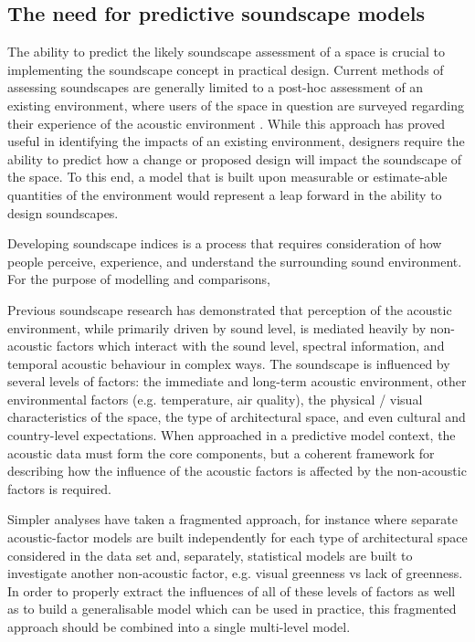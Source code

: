 \subsection{The need for predictive soundscape models}
The ability to predict the likely soundscape assessment of a space is crucial to implementing the soundscape concept in practical design. Current methods of assessing soundscapes are generally limited to a post-hoc assessment of an existing environment, where users of the space in question are surveyed regarding their experience of the acoustic environment \citep{Engel2018Review, Zhang2018Effect}. While this approach has proved useful in identifying the impacts of an existing environment, designers require the ability to predict how a change or proposed design will impact the soundscape of the space. To this end, a model that is built upon measurable or estimate-able quantities of the environment would represent a leap forward in the ability to design soundscapes.

Developing soundscape indices is a process that requires consideration of how people perceive, experience, and understand the surrounding sound environment. For the purpose of modelling and comparisons,

Previous soundscape research has demonstrated that perception of the acoustic environment, while primarily driven by sound level, is mediated heavily by non-acoustic factors which interact with the sound level, spectral information, and temporal acoustic behaviour in complex ways. The soundscape is influenced by several levels of factors: the immediate and long-term acoustic environment, other environmental factors (e.g. temperature, air quality), the physical / visual characteristics of the space, the type of architectural space, and even cultural and country-level expectations. When approached in a predictive model context, the acoustic data must form the core components, but a coherent framework for describing how the influence of the acoustic factors is affected by the non-acoustic factors is required.

Simpler analyses have taken a fragmented approach, for instance where separate acoustic-factor models are built independently for each type of architectural space considered in the data set and, separately, statistical models are built to investigate another non-acoustic factor, e.g. visual greenness vs lack of greenness. In order to properly extract the influences of all of these levels of factors as well as to build a generalisable model which can be used in practice, this fragmented approach should be combined into a single multi-level model.

